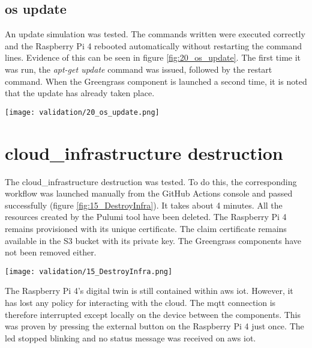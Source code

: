 \subsection{\texorpdfstring{\acrshort{os}}{} update}
An update simulation was tested. The commands written were executed correctly and the Raspberry Pi 4 rebooted automatically without restarting the command lines. Evidence of this can be seen in figure \ref{fig:20_os_update}. The first time it was run, the \textit{apt-get update} command was issued, followed by the restart command. When the Greengrass component is launched a second time, it is noted that the update has already taken place.
\begin{center}
    \begingroup
    \texttt{[image: validation/20\_os\_update.png]}
    \label{fig:20_os_update}
    \endgroup
\end{center}

\section{\texorpdfstring{\Gls{cloud_infrastructure}}{} destruction}

The \gls{cloud_infrastructure} destruction was tested. To do this, the corresponding workflow was launched manually from the GitHub Actions console and passed successfully (figure \ref{fig:15_DestroyInfra}). It takes about 4 minutes. All the resources created by the Pulumi tool have been deleted. The Raspberry Pi 4 remains provisioned with its unique certificate. The claim certificate remains available in the S3 bucket with its private key. The Greengrass components have not been removed either.
\begin{center}
    \begingroup
    \texttt{[image: validation/15\_DestroyInfra.png]}
    \label{fig:15_DestroyInfra}
    \endgroup
\end{center}
The Raspberry Pi 4's digital twin is still contained within \gls{aws} \acrshort{iot}. However, it has lost any policy for interacting with the \gls{cloud}. The \acrshort{mqtt} connection is therefore interrupted except locally on the device between the components. This was proven by pressing the external button on the Raspberry Pi 4 just once. The led stopped blinking and no status message was received on \gls{aws} \acrshort{iot}.

